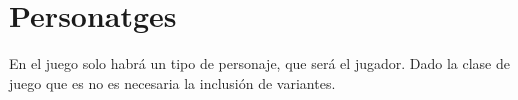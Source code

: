 \section{Personatges}
En el juego solo habrá un tipo de personaje, que será el jugador. Dado la clase de juego que es no es necesaria la inclusión de variantes.